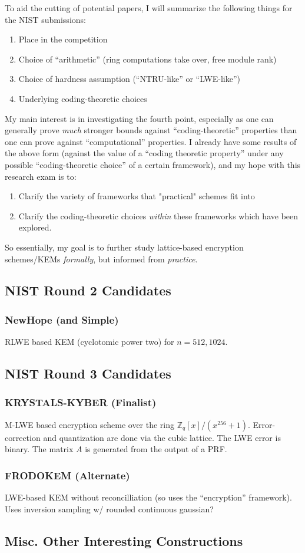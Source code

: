 \documentclass{article}
\begin{document}
	To aid the cutting of potential papers, I will summarize the following things for the NIST submissions:
	\begin{enumerate}
		\item Place in the competition
		\item Choice of ``arithmetic'' (ring computations take over, free module rank)
		\item Choice of hardness assumption (``NTRU-like'' or ``LWE-like'')
		\item Underlying coding-theoretic choices
	\end{enumerate}
	My main interest is in investigating the fourth point, especially as one can generally prove \emph{much} stronger bounds against ``coding-theoretic'' properties than one can prove against ``computational'' properties.
	I already have some results of the above form (against the value of a ``coding theoretic property'' under any possible ``coding-theoretic choice'' of a certain framework), and my hope with this research exam is to:
	\begin{enumerate}
		\item Clarify the variety of frameworks that "practical" schemes fit into
		\item Clarify the coding-theoretic choices \emph{within} these frameworks which have been explored.
	\end{enumerate}
	So essentially, my goal is to further study lattice-based encryption schemes/KEMs \emph{formally}, but informed from \emph{practice}.
	\subsection{NIST Round 2 Candidates}
	\subsubsection{NewHope (and Simple)}
	RLWE based KEM (cyclotomic power two) for $n = 512, 1024$.
	
	
	\subsection{NIST Round 3 Candidates}
	\subsubsection{KRYSTALS-KYBER (Finalist)}
	M-LWE based encryption scheme over the ring $\mathbb{Z}_q[x] / (x^{256}+1)$.
	Error-correction and quantization are done via the cubic lattice.
	The LWE error is binary.
	The matrix $A$ is generated from the output of a PRF.
	\subsubsection{FRODOKEM (Alternate)}
	LWE-based KEM without reconcilliation (so uses the ``encryption'' framework).
	Uses inversion sampling w/ rounded continuous gaussian?
	
	
	
	
	\subsection{Misc. Other Interesting Constructions}
	
	
	
	
\end{document}
